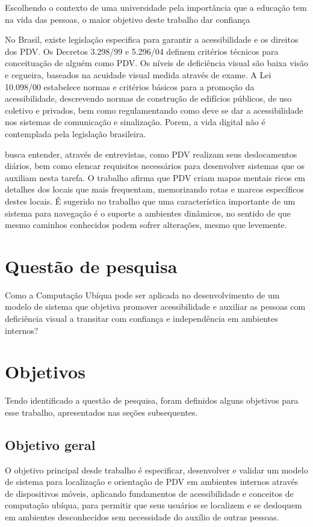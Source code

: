 \documentclass[english,brazilian]{UNISINOSmonografia}
\begin{document}
Escolhendo o contexto de uma universidade pela importância que a educação tem na vida das pessoas, o maior objetivo deste trabalho dar confiança 







No Brasil, existe legislação especifica para garantir a acessibilidade e os direitos dos PDV. Os Decretos 3.298/99 e 5.296/04 definem critérios técnicos para conceituação de alguém como PDV. Os níveis de deficiência visual são baixa visão e cegueira, baseados na acuidade visual medida através de exame. A Lei 10.098/00 estabelece normas e critérios básicos para a promoção da acessibilidade, descrevendo normas de construção de edifícios públicos, de uso coletivo e privados, bem como regulamentando como deve se dar a acessibilidade nos sistemas de comunicação e sinalização. Porem, a vida digital não é contemplada pela legislação brasileira.


 busca entender, através de entrevistas, como PDV realizam seus deslocamentos diários, bem como elencar requisitos necessários para desenvolver sistemas que os auxiliam nesta tarefa. O trabalho afirma que PDV criam mapas mentais ricos em detalhes dos locais que mais frequentam, memorizando rotas e marcos específicos destes locais. É sugerido no trabalho que uma característica importante de um sistema para navegação é o suporte a ambientes dinâmicos, no sentido de que mesmo caminhos conhecidos podem sofrer alterações, mesmo que levemente.
	
	

	\section{Questão de pesquisa}
	Como a Computação Ubíqua pode ser aplicada no desenvolvimento de um modelo de sistema que objetiva promover acessibilidade e auxiliar as pessoas com deficiência visual a transitar com confiança e independência em ambientes internos?

	\section{Objetivos}
	Tendo identificado a questão de pesquisa, foram definidos alguns objetivos para esse trabalho, apresentados nas seções subsequentes.
	
		\subsection{Objetivo geral}
		O objetivo principal desde trabalho é especificar, desenvolver e validar um modelo de sistema para localização e orientação de PDV em ambientes internos através de dispositivos móveis, aplicando fundamentos de acessibilidade e conceitos de computação ubíqua, para permitir que seus usuários se localizem e se desloquem em ambientes desconhecidos sem necessidade do auxílio de outras pessoas.
\end{document}
